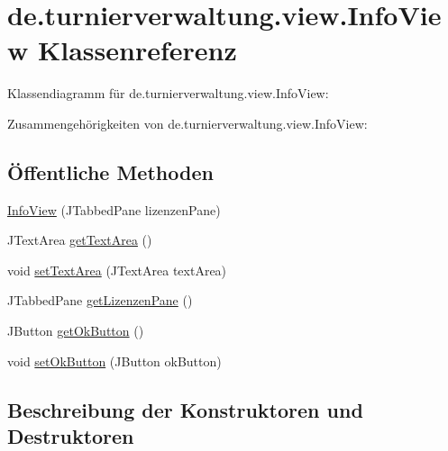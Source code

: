 \hypertarget{classde_1_1turnierverwaltung_1_1view_1_1_info_view}{}\section{de.\+turnierverwaltung.\+view.\+Info\+View Klassenreferenz}
\label{classde_1_1turnierverwaltung_1_1view_1_1_info_view}


Klassendiagramm für de.\+turnierverwaltung.\+view.\+Info\+View\+:


Zusammengehörigkeiten von de.\+turnierverwaltung.\+view.\+Info\+View\+:
\subsection*{Öffentliche Methoden}
\begin{DoxyCompactItemize}
\item 
\hyperlink{classde_1_1turnierverwaltung_1_1view_1_1_info_view_a4a3fa17a762983eab261a5069b3ba312}{Info\+View} (J\+Tabbed\+Pane lizenzen\+Pane)
\item 
J\+Text\+Area \hyperlink{classde_1_1turnierverwaltung_1_1view_1_1_info_view_adb2edd385bf271432172df65a2f09fa5}{get\+Text\+Area} ()
\item 
void \hyperlink{classde_1_1turnierverwaltung_1_1view_1_1_info_view_a9095ce6ddc7d58186166a4e3bfb9c151}{set\+Text\+Area} (J\+Text\+Area text\+Area)
\item 
J\+Tabbed\+Pane \hyperlink{classde_1_1turnierverwaltung_1_1view_1_1_info_view_a07dfe6980a32613240141cb1a4d74801}{get\+Lizenzen\+Pane} ()
\item 
J\+Button \hyperlink{classde_1_1turnierverwaltung_1_1view_1_1_info_view_a8d0c4b50a3423ae8a8c5f175c85dfe3f}{get\+Ok\+Button} ()
\item 
void \hyperlink{classde_1_1turnierverwaltung_1_1view_1_1_info_view_a2469daedee924948c6e20c5dd092805b}{set\+Ok\+Button} (J\+Button ok\+Button)
\end{DoxyCompactItemize}


\subsection{Beschreibung der Konstruktoren und Destruktoren}
